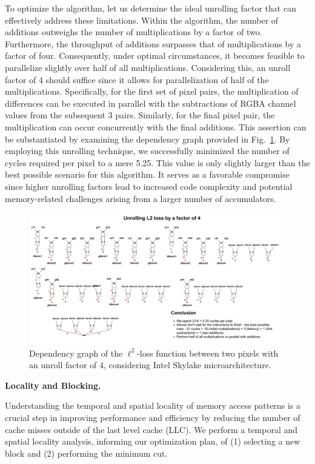 \documentclass[letterpaper]{article}
\newcommand{\mypar}[1]{{\bf #1.}}
\begin{document}
To optimize the algorithm, let us determine the ideal unrolling factor that can effectively address these limitations. Within the algorithm, the number of additions outweighs the number of multiplications by a factor of two. Furthermore, the throughput of additions surpasses that of multiplications by a factor of four. Consequently, under optimal circumstances, it becomes feasible to parallelize slightly over half of all multiplications. Considering this, an unroll factor of 4 should suffice since it allows for parallelization of half of the multiplications. Specifically, for the first set of pixel pairs, the multiplication of differences can be executed in parallel with the subtractions of RGBA channel values from the subsequent 3 pairs. Similarly, for the final pixel pair, the multiplication can occur concurrently with the final additions. This assertion can be substantiated by examining the dependency graph provided in Fig.~\ref{unroll}. By employing this unrolling technique, we successfully minimized the number of cycles required per pixel to a mere 5.25. This value is only slightly larger than the best possible scenario for this algorithm. It serves as a favorable compromise since higher unrolling factors lead to increased code complexity and potential memory-related challenges arising from a larger number of accumulators.

\begin{figure}[htbp]
\centering
  \includegraphics[scale=0.18]{Unrolling.pdf}
  \caption{Dependency graph of the $\ell^2$-loss function between two pixels with an unroll factor of 4, considering Intel Skylake microarchitecture.\label{unroll}}
\end{figure}

\mypar{Locality and Blocking}

Understanding the temporal and spatial locality of memory access patterns is a crucial step in improving performance and efficiency by reducing the number of cache misses outside of the last level cache (LLC). We perform a temporal and spatial locality analysis, informing our optimization plan, of (1) selecting a new block and (2) performing the minimum cut. 
\end{document}
